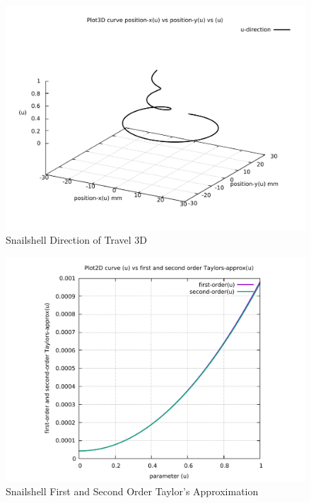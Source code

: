 \begin{figure}
	\caption     {Snailshell Direction of Travel 3D}
	\label{04-img-Snailshell Direction of Travel 3D.pdf}
	\includegraphics[width=1.00\textwidth]{Chap4/appendix/app-Snailshell/plots/04-img-Snailshell Direction of Travel 3D.pdf}
\end{figure}

\clearpage
\pagebreak

\begin{figure}
	\caption     {Snailshell First and Second Order Taylor's Approximation}
	\label{05-img-Snailshell-First-and-Second-Order-Taylors-Approx.pdf}
	\includegraphics[width=1.00\textwidth]{Chap4/appendix/app-Snailshell/plots/05-img-Snailshell-First-and-Second-Order-Taylors-Approx.pdf}
\end{figure}


